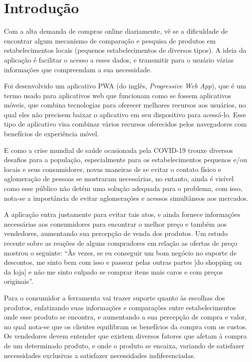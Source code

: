 \section{Introdução}
\label{sec:introducao}

Com a alta demanda de compras online diariamente, vê se a dificuldade de encontrar algum mecanismo de comparação e pesquisa de produtos em estabelecimentos locais (pequenos estabelecimentos de diversos tipos). A ideia da aplicação é facilitar o acesso a esses dados, e transmitir para o usuário várias informações que compreendam a sua necessidade.

Foi desenvolvido um aplicativo PWA (do inglês, \textit{Progressive Web App}), que é um termo usado para aplicativos web que funcionam como se fossem aplicativos móveis, que combina tecnologias para oferecer melhores recursos aos usuários, no qual eles não precisem baixar o aplicativo em seu dispositivo para acessá-lo. Esse tipo de aplicativo visa combinar vários recursos oferecidos pelos navegadores com benefícios de experiência móvel. {\cite{souza2017pwa}}

E como a crise mundial de saúde ocasionada pela COVID-19 trouxe diversos desafios para a população, especialmente para os estabelecimentos pequenos e/ou locais e seus consumidores, novas maneiras de se evitar o contato físico e aglomeração de pessoas se mostraram necessárias, no entanto, ainda é visível como esse público não detém uma solução adequada para o problema, com isso, nota-se a importância de evitar aglomerações e acessos simultâneos aos mercados.

A aplicação entra justamente para evitar tais atos, e ainda fornece informações necessárias aos consumidores para encontrar o melhor preço e também aos vendedores, aumentando sua percepção de venda dos produtos. Um estudo recente sobre as reações de alguns compradores em relação as ofertas de preço mostrou o seguinte: ``Às vezes, se eu conseguir um bom negócio no suporte de descontos, me sinto bem com isso e passear pelas outras partes [do shopping ou da loja] e não me sinto culpado se comprar itens mais caros e com preços originais''.{\cite{grewal1998effects}} 

Para o consumidor a ferramenta vai trazer suporte quanto às escolhas dos produtos, enfatizando suas informações e comparações entre estabelecimentos onde esse produto se encontra, e aumentando a sua percepção de compra e valor, no qual nota-se que os clientes equilibram os benefícios da compra com os custos{\cite{grewal1998effects}}. Os vendedores devem entender que existem diversos fatores que afetam à compra de um determinado produto, e onde o produto se encaixa, variando de satisfazer necessidades exclusivas a satisfazer necessidades indiferenciadas.{\cite{grewal1998effects}}



